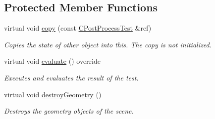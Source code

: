 \subsection*{Protected Member Functions}
\begin{DoxyCompactItemize}
\item 
\mbox{\label{class_unit_test_1_1_c_post_process_test_af0854146ca31f1f67b0bda6398583a4c}} 
virtual void \mbox{\hyperlink{class_unit_test_1_1_c_post_process_test_af0854146ca31f1f67b0bda6398583a4c}{copy}} (const \mbox{\hyperlink{class_unit_test_1_1_c_post_process_test}{C\+Post\+Process\+Test}} \&ref)
\begin{DoxyCompactList}\small\item\em Copies the state of other object into this. The copy is not initialized. \end{DoxyCompactList}\item 
\mbox{\label{class_unit_test_1_1_c_post_process_test_a69496ae6622a4eb8b0f24fc4fa788b17}} 
virtual void \mbox{\hyperlink{class_unit_test_1_1_c_post_process_test_a69496ae6622a4eb8b0f24fc4fa788b17}{evaluate}} () override
\begin{DoxyCompactList}\small\item\em Executes and evaluates the result of the test. \end{DoxyCompactList}\item 
\mbox{\label{class_unit_test_1_1_c_post_process_test_ad58d23d53d40a03526ea76fe564a1c39}} 
virtual void \mbox{\hyperlink{class_unit_test_1_1_c_post_process_test_ad58d23d53d40a03526ea76fe564a1c39}{destroy\+Geometry}} ()
\begin{DoxyCompactList}\small\item\em Destroys the geometry objects of the scene. \end{DoxyCompactList}\end{DoxyCompactItemize}
